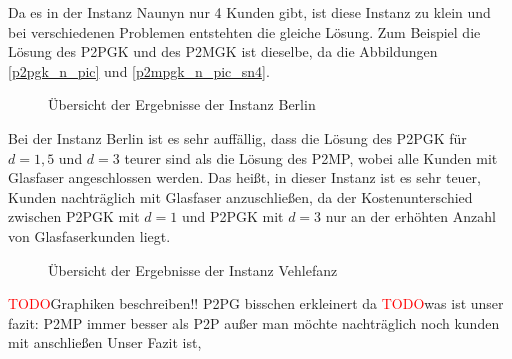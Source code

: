 \documentclass[11pt,a4paper]{article}
\newcommand{\TODO}{\textcolor{red}{TODO}}
\theoremstyle{my_th_style1}
\begin{document}
 Da es in der Instanz Naunyn nur 4 Kunden gibt, ist diese Instanz zu klein und bei verschiedenen Problemen entstehten die gleiche Lösung. Zum Beispiel die Lösung des P2PGK und des P2MGK ist dieselbe, da die Abbildungen \eqref{p2pgk_n_pic} und \eqref{p2mpgk_n_pic_sn4}.
 
 \begin{figure}[!htbp]
 	\caption{\"Ubersicht der Ergebnisse der Instanz Berlin}
 \end{figure}
 
 Bei der Instanz Berlin ist es sehr auffällig, dass die Lösung des P2PGK für $d=1,5$ und $d=3$ teurer sind als die Lösung des P2MP, wobei alle Kunden mit Glasfaser angeschlossen werden. Das heißt, in dieser Instanz ist es sehr teuer, Kunden nachträglich mit Glasfaser anzuschließen, da der Kostenunterschied zwischen P2PGK mit $d=1$ und P2PGK mit $d=3$ nur an der erhöhten Anzahl von Glasfaserkunden liegt. 
 
 
  \begin{figure}[!htbp]
 	\caption{\"Ubersicht der Ergebnisse der Instanz Vehlefanz}
 \end{figure}
 \TODO Graphiken beschreiben!! P2PG bisschen erkleinert da 
\TODO was ist unser fazit:
P2MP immer besser als P2P außer man möchte nachträglich noch kunden mit anschließen
Unser Fazit ist, 
\newpage

\renewcommand{\refname}{Literaturverzeichnis}

\thispagestyle{empty}
\newpage
\appendix
\end{document}
